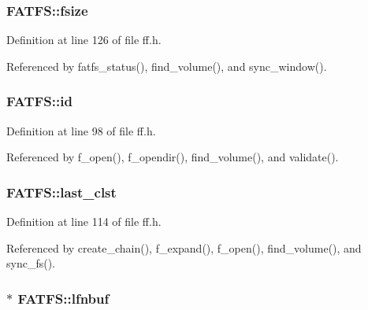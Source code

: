 \subsubsection[{\texorpdfstring{fsize}{fsize}}]{ F\+A\+T\+F\+S\+::fsize}\hypertarget{structFATFS_a53e9560659f14e66f306c2c444198bf3}{}\label{structFATFS_a53e9560659f14e66f306c2c444198bf3}


Definition at line 126 of file ff.\+h.



Referenced by fatfs\+\_\+status(), find\+\_\+volume(), and sync\+\_\+window().

\subsubsection[{\texorpdfstring{id}{id}}]{ F\+A\+T\+F\+S\+::id}\hypertarget{structFATFS_a417095d7c20d56d417dc0998e0dd5a5c}{}\label{structFATFS_a417095d7c20d56d417dc0998e0dd5a5c}


Definition at line 98 of file ff.\+h.



Referenced by f\+\_\+open(), f\+\_\+opendir(), find\+\_\+volume(), and validate().

\subsubsection[{\texorpdfstring{last\+\_\+clst}{last_clst}}]{ F\+A\+T\+F\+S\+::last\+\_\+clst}\hypertarget{structFATFS_ac26e848817569fedc15a9a4e49ddedd1}{}\label{structFATFS_ac26e848817569fedc15a9a4e49ddedd1}


Definition at line 114 of file ff.\+h.



Referenced by create\+\_\+chain(), f\+\_\+expand(), f\+\_\+open(), find\+\_\+volume(), and sync\+\_\+fs().

\subsubsection[{\texorpdfstring{lfnbuf}{lfnbuf}}]{$\ast$ F\+A\+T\+F\+S\+::lfnbuf}\hypertarget{structFATFS_ad1999aa771ae428c3abe14dbe585e981}{}\label{structFATFS_ad1999aa771ae428c3abe14dbe585e981}


